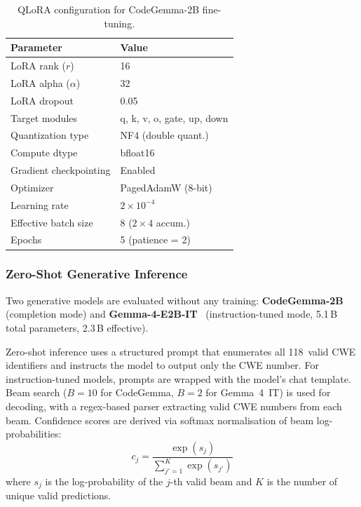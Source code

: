 \documentclass[conference]{IEEEtran}
\begin{document}
\begin{table}[H]
\centering
\caption{QLoRA configuration for CodeGemma-2B fine-tuning.}
\label{tab:qlora_config}
\small
\setlength{\tabcolsep}{6pt}
\renewcommand{\arraystretch}{1.08}
\begin{tabular}{ll}
\toprule
\textbf{Parameter} & \textbf{Value} \\
\midrule
LoRA rank ($r$)        & 16 \\
LoRA alpha ($\alpha$)  & 32 \\
LoRA dropout           & 0.05 \\
Target modules         & q, k, v, o, gate, up, down \\
Quantization type      & NF4 (double quant.) \\
Compute dtype          & bfloat16 \\
Gradient checkpointing & Enabled \\
Optimizer              & PagedAdamW (8-bit) \\
Learning rate          & $2 \times 10^{-4}$ \\
Effective batch size   & 8 ($2 \times 4$ accum.) \\
Epochs                 & 5 (patience = 2) \\
\bottomrule
\end{tabular}
\end{table}

\subsubsection{Zero-Shot Generative Inference}
Two generative models are evaluated without any training:
\textbf{CodeGemma-2B}~\cite{team2024codegemma} (completion mode) and
\textbf{Gemma-4-E2B-IT}~\cite{team2024gemma} (instruction-tuned mode, 5.1\,B
total parameters, 2.3\,B effective).

Zero-shot inference uses a structured prompt that enumerates all 118~valid
CWE identifiers and instructs the model to output only the CWE number.
For instruction-tuned models, prompts are wrapped with the model's chat
template.  Beam search ($B = 10$ for CodeGemma, $B = 2$ for Gemma~4~IT) is
used for decoding, with a regex-based parser extracting valid CWE numbers
from each beam.  Confidence scores are derived via softmax normalisation
of beam log-probabilities:
\begin{equation}
    c_j = \frac{\exp(s_j)}{\sum_{j'=1}^{K} \exp(s_{j'})}
\label{eq:beam_confidence}
\end{equation}
where $s_j$ is the log-probability of the $j$-th valid beam and $K$ is the
number of unique valid predictions.
\end{document}
